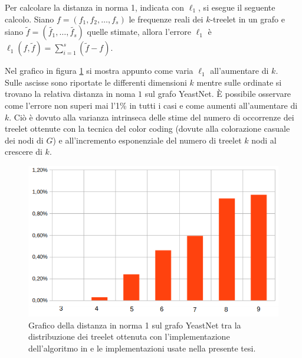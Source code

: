 Per calcolare la distanza in norma 1, indicata con $ \ell_1 $, si esegue il seguente calcolo. 
Siano $ f=(f_1,f_2,\dots,f_s) $ le frequenze reali dei $ k $-treelet in un grafo e siano $ \tilde{f}=(\tilde{f_1},\dots,\tilde{f_s}) $ quelle stimate, allora l'errore $ \ell_1 $ è $ \ell_1(f,\tilde{f}) = \sum_{i=1}^{s}{ (\tilde{f}-f)}$.

Nel grafico in figura \ref{ERROR} si mostra appunto come varia $ \ell_1 $ all'aumentare di $ k $.\\
Sulle ascisse sono riportate le differenti dimensioni $ k $ mentre sulle ordinate si trovano la relativa distanza in noma $1$ sul grafo YeastNet.
È possibile osservare come l'errore non superi mai l'1\% in tutti i casi e come aumenti all'aumentare di $k$. 
Ciò è dovuto alla varianza intrinseca delle stime del numero di occorrenze dei treelet ottenute con la tecnica del color coding (dovute alla colorazione casuale dei nodi di $G$) e all'incremento esponenziale del numero di treelet $k$ nodi al crescere di $k$.
 

\begin{figure}[htbp]
	\includegraphics[width=15.4cm]{capitolo4/grafoErrorel1}
	\caption{Grafico della distanza in norma 1 sul grafo YeastNet tra la distribuzione dei treelet ottenuta con l'implementazione dell'algoritmo in \cite{bressan2019motivo} e le implementazioni usate nella presente tesi.}
	\label{ERROR}
\end{figure}


